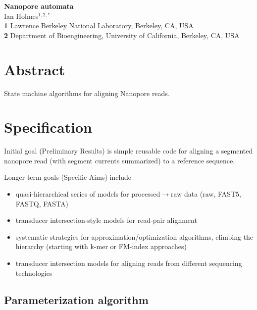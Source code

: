 \documentclass[10pt]{article}
\date{}
\newcommand\titlestring{Nanopore automata}
\newcommand\authorstring{
Ian Holmes$^{1,2,\ast}$
\\
\textbf{1} Lawrence Berkeley National Laboratory, Berkeley, CA, USA
\\
\textbf{2} Department of Bioengineering, University of California, Berkeley, CA, USA
}
\begin{document}
\begin{flushleft}
  {\Large
    \textbf{\titlestring}
  }
\\
\authorstring
\end{flushleft}


\tableofcontents


\section{Abstract}
State machine algorithms for aligning Nanopore reads.




\section{Specification}

Initial goal (Preliminary Results) is simple reusable code for aligning a segmented nanopore read (with segment currents summarized) to a reference sequence.

Longer-term goals (Specific Aims) include
\begin{itemize}
\item quasi-hierarchical series of models for processed$\to$raw data (raw, FAST5, FASTQ, FASTA)
\item transducer intersection-style models for read-pair alignment
\item systematic strategies for approximation/optimization algorithms, climbing the hierarchy (starting with k-mer or FM-index approaches)
\item transducer intersection models for aligning reads from different sequencing technologies
\end{itemize}

\subsection{Parameterization algorithm}
\end{document}

